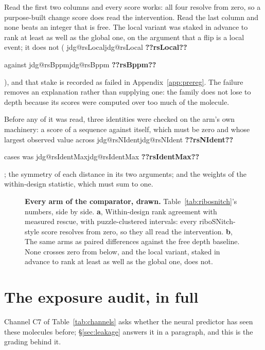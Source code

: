 \documentclass[11pt]{article}
\makeatletter
\newcommand{\jdg}[1]{%
  \ifcsname jdg@#1\endcsname\csname jdg@#1\endcsname
  \else\textbf{??#1??}\PackageError{nm}{undefined measured quantity #1}{}\fi}
\makeatother
\begin{document}
\begin{table}[!htbp]
\centering\small
\caption{\textbf{Four scores built for a mutation, and one integer that is not.} Within-design
rank agreement with measured rescue, and the paired difference against the free depth baseline.}
\label{tab:ribosnitch}

\end{table}

Read the first two columns and every score works: all four resolve from zero, so a purpose-built
change score does read the intervention. Read the last column and none beats an integer that is
free. The local variant was staked in advance to rank at least as well as the global one, on the
argument that a flip is a local event; it does not (\jdg{rsLocal} against \jdg{rsBppm}), and that
stake is recorded as failed in Appendix~\ref{app:prereg}. The failure removes an explanation rather
than supplying one: the family does not lose to depth because its scores were computed over too
much of the molecule.

Before any of it was read, three identities were checked on the arm's own machinery: a score of a
sequence against itself, which must be zero and whose largest observed value across \jdg{rsNIdent}
cases was \jdg{rsIdentMax}; the symmetry of each distance in its two arguments; and the weights of
the within-design statistic, which must sum to one.

\FloatBarrier
\begin{figure}[!htbp]
\centering

\caption{\textbf{Every arm of the comparator, drawn.} Table~\ref{tab:ribosnitch}'s numbers, side
by side. \textbf{a}, Within-design rank agreement with measured rescue, with puzzle-clustered
intervals: every riboSNitch-style score resolves from zero, so they all read the intervention.
\textbf{b}, The same arms as paired differences against the free depth baseline. None crosses zero
from below, and the local variant, staked in advance to rank at least as well as the global one,
does not.}
\label{fig:ribosnitchfig}
\end{figure}

\section{The exposure audit, in full}
\label{app:exposure}

Channel C7 of Table~\ref{tab:channels} asks whether the neural predictor has seen these molecules
before; \S\ref{sec:leakage} answers it in a paragraph, and this is the grading behind it.
\end{document}
